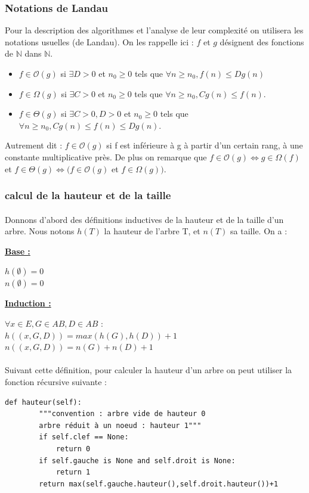 \documentclass{report}
\begin{document}
\subsubsection{Notations de Landau}
Pour la description des algorithmes et l'analyse de leur complexité on utilisera les notations usuelles (de Landau). On les rappelle ici :
$f$ et $g$ désignent des fonctions de $\mathbb{N}$ dans $\mathbb{N}$.
\begin{itemize}
\item $f \in \mathcal{O}(g)$ si $\exists D > 0$ et $n_0 \geq 0$ tels que $\forall n \geq n_0, f(n) \leq Dg(n)$
\item $f \in \Omega(g)$ si $\exists C >0$ et $n_0 \geq 0$ tels que $\forall n \geq n_0, Cg(n) \leq f(n)$.
\item $f \in \Theta(g)$ si $\exists C>0, D>0$ et $n_0 \geq 0$ tels que $\forall n \geq n_0, Cg(n) \leq f(n) \leq Dg(n)$.
\end{itemize}

Autrement dit : $f \in \mathcal{O}(g)$ si f est inférieure à g à partir d'un certain rang, à une constante multiplicative près. 
De plus on remarque que $f \in \mathcal{O}(g) \iff g \in \Omega(f)$ et $f \in \Theta(g) \iff (f \in \mathcal{O}(g)$ et $f \in \Omega(g))$.
\subsubsection{calcul de la hauteur et de la taille}
\paragraph{}
Donnons d'abord des définitions inductives de la hauteur et de la taille d'un arbre. Nous notons $h(T)$ la hauteur de l'arbre T, et $n(T)$ sa taille. On a :
\begin{flushleft}
    \bf
    \underline{Base :}
    
\end{flushleft}
$h(\emptyset) = 0$ \\
$n(\emptyset) = 0$ \\
\begin{flushleft}
    \bf
    \underline{Induction :}
\end{flushleft}
    $\forall x \in E, G \in AB, D \in AB$ : \\
    $h((x,G,D))= max(h(G),h(D))+1$ \\
    $n((x,G,D))= n(G)+n(D)+1$
    
\paragraph{}
Suivant cette définition, pour calculer la hauteur d'un arbre on peut utiliser la fonction récursive suivante :
\begin{lstlisting}
def hauteur(self):
		"""convention : arbre vide de hauteur 0
		arbre réduit à un noeud : hauteur 1"""
		if self.clef == None:
			return 0
		if self.gauche is None and self.droit is None:
			return 1
		return max(self.gauche.hauteur(),self.droit.hauteur())+1
\end{lstlisting}
\end{document}
